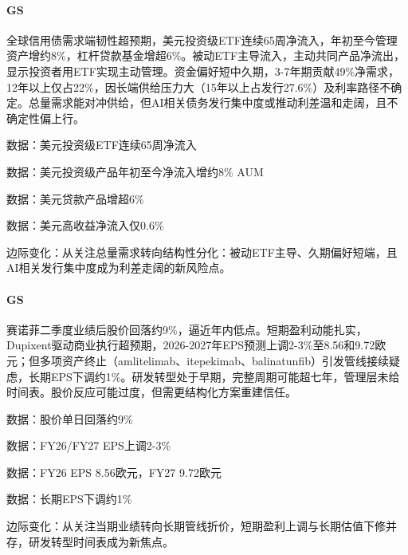 \documentclass[11pt]{ctexart}
\begin{document}
\paragraph{GS} 全球信用债需求端韧性超预期，美元投资级ETF连续65周净流入，年初至今管理资产增约8\%，杠杆贷款基金增超6\%。被动ETF主导流入，主动共同产品净流出，显示投资者用ETF实现主动管理。资金偏好短中久期，3-7年期贡献49\%净需求，12年以上仅占22\%，因长端供给压力大（15年以上占发行27.6\%）及利率路径不确定。总量需求能对冲供给，但AI相关债务发行集中度或推动利差温和走阔，且不确定性偏上行。
{\small\color{refgray}数据：美元投资级ETF连续65周净流入\par}
{\small\color{refgray}数据：美元投资级产品年初至今净流入增约8\% AUM\par}
{\small\color{refgray}数据：美元贷款产品增超6\%\par}
{\small\color{refgray}数据：美元高收益净流入仅0.6\%\par}
{\small\color{refgray}边际变化：从关注总量需求转向结构性分化：被动ETF主导、久期偏好短端，且AI相关发行集中度成为利差走阔的新风险点。\par}
\paragraph{GS} 赛诺菲二季度业绩后股价回落约9\%，逼近年内低点。短期盈利动能扎实，Dupixent驱动商业执行超预期，2026-2027年EPS预测上调2-3\%至8.56和9.72欧元；但多项资产终止（amlitelimab、itepekimab、balinatunfib）引发管线接续疑虑，长期EPS下调约1\%。研发转型处于早期，完整周期可能超七年，管理层未给时间表。股价反应可能过度，但需更结构化方案重建信任。
{\small\color{refgray}数据：股价单日回落约9\%\par}
{\small\color{refgray}数据：FY26/FY27 EPS上调2-3\%\par}
{\small\color{refgray}数据：FY26 EPS 8.56欧元，FY27 9.72欧元\par}
{\small\color{refgray}数据：长期EPS下调约1\%\par}
{\small\color{refgray}边际变化：从关注当期业绩转向长期管线折价，短期盈利上调与长期估值下修并存，研发转型时间表成为新焦点。\par}
\end{document}
